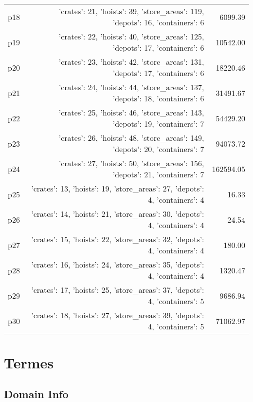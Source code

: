 \documentclass{article}
\begin{document}
\begin{center}
\begin{tabular}{@{}l|r|r@{}}
  p18&{'crates': 21, 'hoists': 39, 'store\_areas': 119, 'depots': 16, 'containers': 6}&6099.39\\
  p19&{'crates': 22, 'hoists': 40, 'store\_areas': 125, 'depots': 17, 'containers': 6}&10542.00\\
  p20&{'crates': 23, 'hoists': 42, 'store\_areas': 131, 'depots': 17, 'containers': 6}&18220.46\\
  p21&{'crates': 24, 'hoists': 44, 'store\_areas': 137, 'depots': 18, 'containers': 6}&31491.67\\
  p22&{'crates': 25, 'hoists': 46, 'store\_areas': 143, 'depots': 19, 'containers': 7}&54429.20\\
  p23&{'crates': 26, 'hoists': 48, 'store\_areas': 149, 'depots': 20, 'containers': 7}&94073.72\\
  p24&{'crates': 27, 'hoists': 50, 'store\_areas': 156, 'depots': 21, 'containers': 7}&162594.05\\
  p25&{'crates': 13, 'hoists': 19, 'store\_areas': 27, 'depots': 4, 'containers': 4}&16.33\\
  p26&{'crates': 14, 'hoists': 21, 'store\_areas': 30, 'depots': 4, 'containers': 4}&24.54\\
  p27&{'crates': 15, 'hoists': 22, 'store\_areas': 32, 'depots': 4, 'containers': 4}&180.00\\
  p28&{'crates': 16, 'hoists': 24, 'store\_areas': 35, 'depots': 4, 'containers': 4}&1320.47\\
  p29&{'crates': 17, 'hoists': 25, 'store\_areas': 37, 'depots': 4, 'containers': 5}&9686.94\\
  p30&{'crates': 18, 'hoists': 27, 'store\_areas': 39, 'depots': 4, 'containers': 5}&71062.97
                            \end{tabular}
                            \end{center}
                    
                            \newpage \section{Termes}
                    \subsection*{Domain Info}
\end{document}
